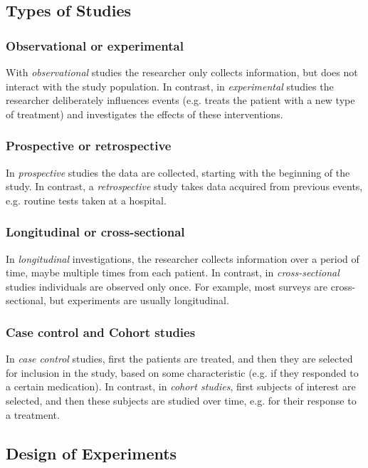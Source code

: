\subsection{Types of Studies}

\subsubsection{Observational or experimental}
With \emph{observational} studies the researcher only collects information, but does not interact with the study population. In contrast, in \emph{experimental} studies the researcher deliberately influences events (e.g. treats the patient with a new type of treatment) and investigates the effects of these interventions.

\subsubsection{Prospective or retrospective}
In \emph{prospective} studies the data are collected, starting with the beginning of the study. In contrast, a \emph{retrospective} study takes data acquired from previous events, e.g. routine tests taken at a hospital.

\subsubsection{Longitudinal or cross-sectional}
In \emph{longitudinal} investigations, the researcher collects information over a period of time, maybe multiple times from each patient. In contrast, in \emph{cross-sectional} studies individuals are observed only once. For example, most surveys are cross-sectional, but experiments are usually longitudinal.

\subsubsection{Case control and Cohort studies}
In \emph{case control} studies, first the patients are treated, and then they are selected for inclusion in the study, based on some characteristic (e.g. if they responded to a certain medication). In contrast, in \emph{cohort studies}, first subjects of interest are selected, and then these subjects are studied over time, e.g. for their response to a treatment.

\subsection{Design of Experiments}

